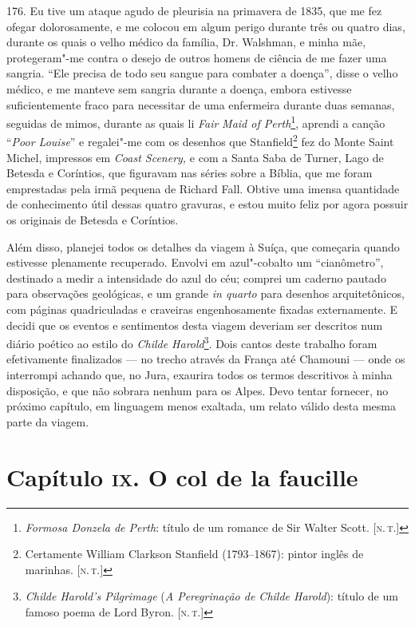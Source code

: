 176. Eu tive um ataque agudo de pleurisia na primavera de 1835, que me
fez ofegar dolorosamente, e me colocou em algum perigo durante três ou
quatro dias, durante os quais o velho médico da família, Dr. Walshman, e
minha mãe, protegeram"-me contra o desejo de outros homens de ciência de
me fazer uma sangria. ``Ele precisa de todo seu sangue para combater a
doença'', disse o velho médico, e me manteve sem sangria durante a
doença, embora estivesse suficientemente fraco para necessitar de uma
enfermeira durante duas semanas, seguidas de mimos, durante as quais li
\emph{Fair} \emph{Maid of Perth}\footnote{\emph{Formosa Donzela de
  Perth}: título de um romance de Sir Walter Scott. {[}\textsc{n.\,t.}{]}},
aprendi a canção ``\emph{Poor Louise}'' e regalei"-me com os desenhos que
Stanfield\footnote{Certamente William Clarkson Stanfield (1793--1867):
  pintor inglês de marinhas. {[}\textsc{n.\,t.}{]}} fez do Monte Saint Michel,
impressos em \emph{Coast Scenery,} e com a Santa Saba de Turner, Lago de
Betesda e Coríntios, que figuravam nas séries sobre a Bíblia, que me
foram emprestadas pela irmã pequena de Richard Fall. Obtive uma imensa
quantidade de conhecimento útil dessas quatro gravuras, e estou muito
feliz por agora possuir os originais de Betesda e Coríntios.

Além disso, planejei todos os detalhes da viagem à Suíça, que começaria
quando estivesse plenamente recuperado. Envolvi em azul"-cobalto um
``cianômetro'', destinado a medir a intensidade do azul do céu; comprei
um caderno pautado para observações geológicas, e um grande \emph{in
quarto} para desenhos arquitetônicos, com páginas quadriculadas e
craveiras engenhosamente fixadas externamente. E decidi que os eventos e
sentimentos desta viagem deveriam ser descritos num diário poético ao
estilo do \emph{Childe Harold}\footnote{\emph{Childe Harold's
  Pilgrimage} (\emph{A Peregrinação de Childe Harold}): título de um
  famoso poema de Lord Byron. {[}\textsc{n.\,t.}{]}}. Dois cantos deste
trabalho foram efetivamente finalizados --- no trecho através da França
até Chamouni --- onde os interrompi achando que, no Jura, exaurira todos
os termos descritivos à minha disposição, e que não sobrara nenhum para
os Alpes. Devo tentar fornecer, no próximo capítulo, em linguagem menos
exaltada, um relato válido desta mesma parte da viagem.

\chapter{Capítulo \textsc{ix}. O col de la faucille}

